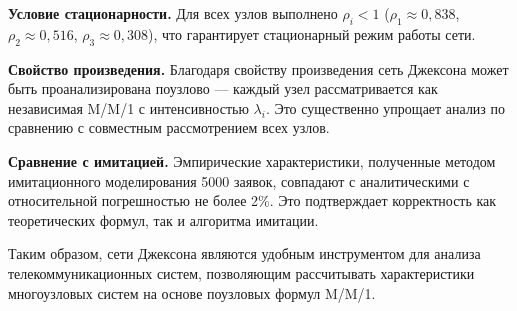 \textbf{Условие стационарности.} Для всех узлов выполнено $\rho_i < 1$ ($\rho_1 \approx 0{,}838$, $\rho_2 \approx 0{,}516$, $\rho_3 \approx 0{,}308$), что гарантирует стационарный режим работы сети.

\textbf{Свойство произведения.} Благодаря свойству произведения сеть Джексона может быть проанализирована поузлово — каждый узел рассматривается как независимая M/M/1 с интенсивностью $\lambda_i$. Это существенно упрощает анализ по сравнению с совместным рассмотрением всех узлов.

\textbf{Сравнение с имитацией.} Эмпирические характеристики, полученные методом имитационного моделирования 5000 заявок, совпадают с аналитическими с относительной погрешностью не более 2\%. Это подтверждает корректность как теоретических формул, так и алгоритма имитации.

Таким образом, сети Джексона являются удобным инструментом для анализа телекоммуникационных систем, позволяющим рассчитывать характеристики многоузловых систем на основе поузловых формул M/M/1.